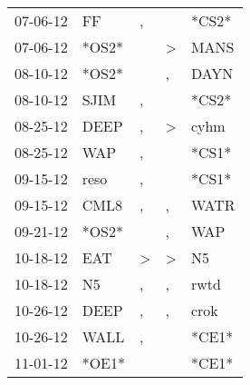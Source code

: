 \begin{supertabular}{p{0.07\textwidth}p{0.06\textwidth}p{0.02\textwidth}p{0.02\textwidth}p{0.06\textwidth}}
          07-06-12\textsuperscript{} &             FF\textsuperscript{} &                , &                  &                            *CS2* \\
          07-06-12\textsuperscript{} &                            *OS2* &                  &     \textgreater &           MANS\textsuperscript{} \\
          08-10-12\textsuperscript{} &                            *OS2* &                  &                , &           DAYN\textsuperscript{} \\
          08-10-12\textsuperscript{} &           SJIM\textsuperscript{} &                , &                  &                            *CS2* \\
          08-25-12\textsuperscript{} &           DEEP\textsuperscript{} &                , &     \textgreater &           cyhm\textsuperscript{} \\
          08-25-12\textsuperscript{} &            WAP\textsuperscript{} &                , &                  &                            *CS1* \\
          09-15-12\textsuperscript{} &           reso\textsuperscript{} &                , &                  &                            *CS1* \\
          09-15-12\textsuperscript{} &           CML8\textsuperscript{} &                , &                , &           WATR\textsuperscript{} \\
          09-21-12\textsuperscript{} &                            *OS2* &                  &                , &            WAP\textsuperscript{} \\
          10-18-12\textsuperscript{} &            EAT\textsuperscript{} &     \textgreater &     \textgreater &             N5\textsuperscript{} \\
          10-18-12\textsuperscript{} &             N5\textsuperscript{} &                , &                , &           rwtd\textsuperscript{} \\
          10-26-12\textsuperscript{} &           DEEP\textsuperscript{} &                , &                , &           crok\textsuperscript{} \\
          10-26-12\textsuperscript{} &           WALL\textsuperscript{} &                , &                  &                            *CE1* \\
          11-01-12\textsuperscript{} &                            *OE1* &                  &                  &                            *CE1* \\

\end{supertabular}
